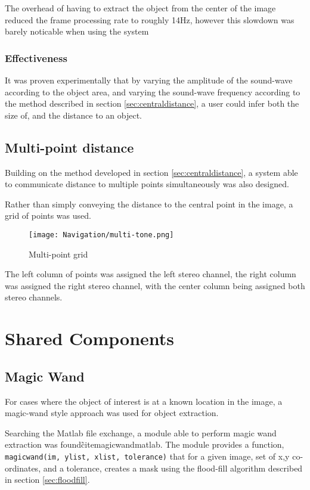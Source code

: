 The overhead of having to extract the object from the center of the image reduced the frame processing rate to roughly 14Hz, however this slowdown was barely noticable when using the system

\subsubsection{Effectiveness}
It was proven experimentally that by varying the amplitude of the sound-wave according to the object area, and varying the sound-wave frequency according to the method described in section \ref{sec:centraldistance}, a user could infer both the size of, and the distance to an object. 


\subsection{Multi-point distance}
Building on the method developed in section \ref{sec:centraldistance}, a system able to communicate distance to multiple points simultaneously was also designed.

Rather than simply conveying the distance to the central point in the image, a grid of points was used.

\begin{figure}[H]
    \centering
    \texttt{[image: Navigation/multi-tone.png]}
    \caption{Multi-point grid}
\end{figure}

The left column of points was assigned the left stereo channel, the right column was assigned the right stereo channel, with the center column being assigned both stereo channels. 

\section{Shared Components}
\label{sec:sharedcomponents}
\subsection{Magic Wand}
\label{sec:magicwand}
For cases where the object of interest is at a known location in the image, a magic-wand style approach was used for object extraction. 

Searching the Matlab file exchange, a module able to perform magic wand extraction was found\~cite{magicwandmatlab}. The module provides a function, \texttt{magicwand(im, ylist, xlist, tolerance)} that for a given image, set of {x,y} co-ordinates, and a tolerance, creates a mask using the flood-fill algorithm described in section \ref{sec:floodfill}.

